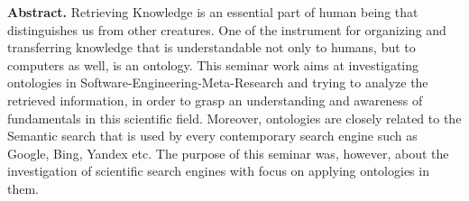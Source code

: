
\textbf{Abstract.} Retrieving Knowledge is an essential part of human being that distinguishes us from other creatures. One of the instrument for organizing and transferring knowledge that is understandable not only to humans, but to computers as well, is an ontology. This seminar work aims at investigating ontologies in Software-Engineering-Meta-Research and trying to analyze the retrieved information, in order to grasp an understanding and awareness of fundamentals in this scientific field. Moreover, ontologies are closely related to the Semantic search that is used by every contemporary search engine such as Google, Bing, Yandex etc. The purpose of this seminar was, however, about the investigation of scientific search engines with focus on applying ontologies in them.        